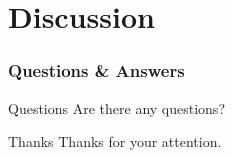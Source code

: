 \section{Discussion}
\begin{frame}
    \frametitle{Questions \& Answers}
    \begin{block}{Questions}
        Are there any questions?
    \end{block}
    \pause
    \begin{block}{Thanks}
    		Thanks for your attention.
    \end{block}
\end{frame}